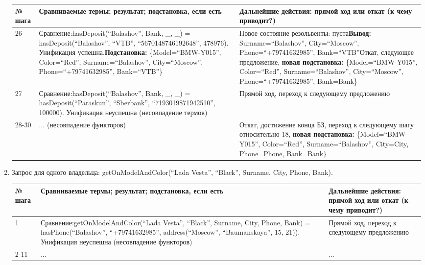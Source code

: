 \documentclass[14pt,a4paper]{scrreprt}
\begin{document}
\begin{enumerate}
\begin{table}[H]
	\centering
	\begin{tabular}{|p{1.2cm\small}|p{9cm\small}|p{5cm\small}|}
		\hline
		№ шага & Сравниваемые термы; результат; подстановка, если есть & Дальнейшие действия: прямой ход или откат (к чему приводит?)\\
		\hline
		26 & Сравнение:\linebreak hasDeposit(``Balashov'', Bank, \_, \_) = hasDeposit(``Balashov'', ``VTB'', ``5670148746192648'', 478976). Унификация успешна.\linebreak \textbf{Подстановка:} \{Model=``BMW-Y015'', Color=``Red'', Surname=``Balashov'', City=``Moscow'', Phone=``+79741632985'', Bank=``VTB''\} & Новое состояние резольвенты: пуста\linebreak \textbf{Вывод:} Surname=``Balashov'', City=``Moscow'', Phone=``+79741632985'', Bank=``VTB''\linebreak Откат, следующее предложение, \textbf{новая подстановка:} \{Model=``BMW-Y015'', Color=``Red'', Surname=``Balashov'', City=``Moscow'', Phone=``+79741632985'', Bank=Bank\}\\
		\hline
		27 & Сравнение:\linebreak hasDeposit(``Balashov'', Bank, \_, \_) = hasDeposit(``Paraskun'', ``Sberbank'', ``7193019871942510'', 100000). Унификация неуспешна (несовпадение термов) & Прямой ход, переход к следующему предложению\\
		\hline
		28-30 & ... (несовпадение функторов) & Откат, достижение конца БЗ, переход к следующему шагу относительно 18, \textbf{новая подстановка:} \{Model=``BMW-Y015'', Color=``Red'', Surname=``Balashov'', City=City, Phone=Phone, Bank=Bank\}\\
		\hline
		
	\end{tabular}
\end{table}

	\item Запрос для одного владельца: getOnModelAndColor(``Lada Vesta'', ``Black'', Surname, City, Phone, Bank).
	
\begin{table}[H]
	\centering
	\begin{tabular}{|p{1.2cm\small}|p{9cm\small}|p{5cm\small}|}
		\hline
		№ шага & Сравниваемые термы; результат; подстановка, если есть & Дальнейшие действия: прямой ход или откат (к чему приводит?)\\
		\hline
		1 & Сравнение:\linebreak getOnModelAndColor(``Lada Vesta'', ``Black'', Surname, City, Phone, Bank) = hasPhone(``Balashov'', ``+79741632985'', address(``Moscow'', ``Baumanskaya'', 15, 21)). Унификация неуспешна (несовпадение функторов) & Прямой ход, переход к следующему предложению\\
		\hline
		2-11 & ...  & ...\\
		\hline
	\end{tabular}
\end{table}{\tiny {\tiny {\tiny {\normalsize }}}}


\end{enumerate}
\end{document}
